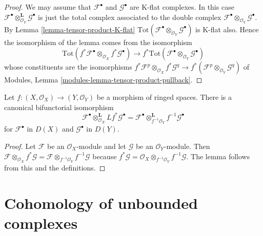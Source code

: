 \begin{proof}
We may assume that $\mathcal{F}^\bullet$ and $\mathcal{G}^\bullet$
are K-flat complexes. In this case
$\mathcal{F}^\bullet \otimes_{\mathcal{O}_Y}^{\mathbf{L}} \mathcal{G}^\bullet$
is just the total complex associated to the double complex
$\mathcal{F}^\bullet \otimes_{\mathcal{O}_Y} \mathcal{G}^\bullet$.
By
Lemma \ref{lemma-tensor-product-K-flat}
$\text{Tot}(\mathcal{F}^\bullet \otimes_{\mathcal{O}_Y} \mathcal{G}^\bullet)$
is K-flat also. Hence the isomorphism of the lemma comes from the
isomorphism
$$
\text{Tot}(f^*\mathcal{F}^\bullet \otimes_{\mathcal{O}_X}
f^*\mathcal{G}^\bullet)
\longrightarrow
f^*\text{Tot}(\mathcal{F}^\bullet \otimes_{\mathcal{O}_Y} \mathcal{G}^\bullet)
$$
whose constituents are the isomorphisms
$f^*\mathcal{F}^p \otimes_{\mathcal{O}_X} f^*\mathcal{G}^q \to
f^*(\mathcal{F}^p \otimes_{\mathcal{O}_Y} \mathcal{G}^q)$ of
Modules, Lemma \ref{modules-lemma-tensor-product-pullback}.
\end{proof}

\begin{lemma}
\label{lemma-variant-derived-pullback}
Let $f : (X, \mathcal{O}_X) \to (Y, \mathcal{O}_Y)$
be a morphism of ringed spaces. There is a canonical bifunctorial
isomorphism
$$
\mathcal{F}^\bullet
\otimes_{\mathcal{O}_X}^{\mathbf{L}}
Lf^*\mathcal{G}^\bullet
=
\mathcal{F}^\bullet 
\otimes_{f^{-1}\mathcal{O}_Y}^{\mathbf{L}}
f^{-1}\mathcal{G}^\bullet 
$$
for $\mathcal{F}^\bullet$ in $D(X)$ and $\mathcal{G}^\bullet$ in $D(Y)$.
\end{lemma}

\begin{proof}
Let $\mathcal{F}$ be an $\mathcal{O}_X$-module and let $\mathcal{G}$
be an $\mathcal{O}_Y$-module. Then
$\mathcal{F} \otimes_{\mathcal{O}_X} f^*\mathcal{G} =
\mathcal{F} \otimes_{f^{-1}\mathcal{O}_Y} f^{-1}\mathcal{G}$
because
$f^*\mathcal{G} =
\mathcal{O}_X \otimes_{f^{-1}\mathcal{O}_Y} f^{-1}\mathcal{G}$.
The lemma follows from this and the definitions.
\end{proof}





\section{Cohomology of unbounded complexes}
\label{section-unbounded}

